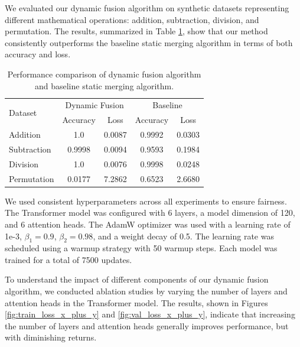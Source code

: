 \documentclass{article} %
\begin{document}
We evaluated our dynamic fusion algorithm on synthetic datasets representing different mathematical operations: addition, subtraction, division, and permutation. The results, summarized in Table \ref{tab:results}, show that our method consistently outperforms the baseline static merging algorithm in terms of both accuracy and loss.

\begin{table}[h]
    \centering
    \caption{Performance comparison of dynamic fusion algorithm and baseline static merging algorithm.}
    \label{tab:results}
    \begin{tabular}{lcccc}
        \toprule
        \multirow{2}{*}{Dataset} & \multicolumn{2}{c}{Dynamic Fusion} & \multicolumn{2}{c}{Baseline} \\
        \cmidrule(r){2-3} \cmidrule(r){4-5}
        & Accuracy & Loss & Accuracy & Loss \\
        \midrule
        Addition & 1.0 & 0.0087 & 0.9992 & 0.0303 \\
        Subtraction & 0.9998 & 0.0094 & 0.9593 & 0.1984 \\
        Division & 1.0 & 0.0076 & 0.9998 & 0.0248 \\
        Permutation & 0.0177 & 7.2862 & 0.6523 & 2.6680 \\
        \bottomrule
    \end{tabular}
\end{table}

We used consistent hyperparameters across all experiments to ensure fairness. The Transformer model was configured with 6 layers, a model dimension of 120, and 6 attention heads. The AdamW optimizer was used with a learning rate of 1e-3, $\beta_1=0.9$, $\beta_2=0.98$, and a weight decay of 0.5. The learning rate was scheduled using a warmup strategy with 50 warmup steps. Each model was trained for a total of 7500 updates.

To understand the impact of different components of our dynamic fusion algorithm, we conducted ablation studies by varying the number of layers and attention heads in the Transformer model. The results, shown in Figures \ref{fig:train_loss_x_plus_y} and \ref{fig:val_loss_x_plus_y}, indicate that increasing the number of layers and attention heads generally improves performance, but with diminishing returns.
\end{document}

